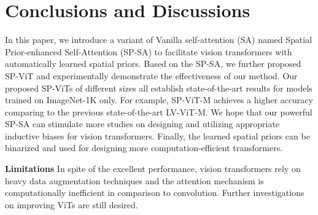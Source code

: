 \documentclass[authorversion, sigconf, acmthm=false, nonacm=true]{acmart}
\begin{document}
\section{Conclusions and Discussions}

In this paper, we introduce a variant of Vanilla self-attention (SA) named Spatial Prior-enhanced Self-Attention (SP-SA) to facilitate vision transformers with automatically learned spatial priors.
Based on the SP-SA, we further proposed SP-ViT and experimentally demonstrate the effectiveness of our method. Our proposed SP-ViTs of different sizes all establish state-of-the-art results for models trained on ImageNet-1K only. For example, SP-ViT-M achieves a  higher accuracy comparing to the previous state-of-the-art LV-ViT-M.  
We hope that our powerful SP-SA can stimulate more studies on designing and utilizing appropriate inductive biases
for vision transformers. Finally, the learned spatial priors can be binarized and used for designing more computation-efficient
transformers.

\noindent\textbf{Limitations} In spite of the excellent performance, vision transformers rely on heavy data augmentation techniques and the attention mechanism is computationally inefficient in comparison to convolution. Further investigations on improving ViTs are still desired.

\clearpage




\appendix
\end{document}
